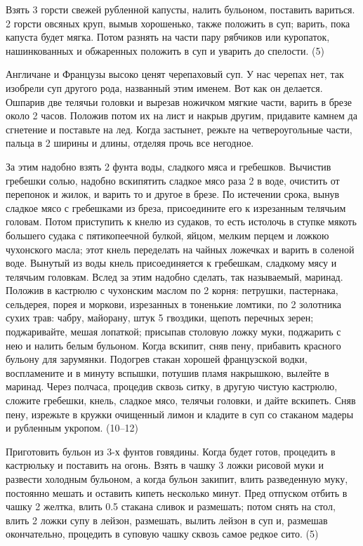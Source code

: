 
Взять 3 горсти свежей рубленной капусты, налить бульоном, поставить вариться. 2 горсти овсяных круп, вымыв хорошенько, также положить в суп; варить, пока капуста будет мягка. Потом разнять на части пару рябчиков или куропаток, нашинкованных и обжаренных положить в суп и уварить до спелости. (5)


Англичане и Французы высоко ценят черепаховый суп. У нас черепах нет, так изобрели суп другого рода, названный этим именем. Вот как он делается. Ошпарив две телячьи головки и вырезав ножичком мягкие части, варить в брезе около 2 часов. Положив потом их на лист и накрыв другим, придавите камнем да сгнетение и поставьте на лед. Когда застынет, режьте на четвероугольные части, пальца в 2 ширины и длины, отделяя прочь все негодное.

За этим надобно взять 2 фунта воды, сладкого мяса и гребешков. Вычистив гребешки солью, надобно вскипятить сладкое мясо раза 2 в воде, очистить от перепонок и жилок, и варить то и другое в брезе. По истечении срока, вынув сладкое мясо с гребешками из бреза, присоедините его к изрезанным телячьим головам. Потом приступить к кнелю из судаков, то есть истолочь в ступке мякоть большего судака с пятикопеечной булкой, яйцом, мелким перцем и ложкою чухонского масла; этот кнель переделать на чайных ложечках и варить в соленой воде. Вынутый из воды кнель присоединяется к гребешкам, сладкому мясу и телячьим головкам. Вслед за этим надобно сделать, так называемый, маринад. Положив в кастрюлю с чухонским маслом по 2 корня: петрушки, пастернака, сельдерея, порея и моркови, изрезанных в тоненькие ломтики, по 2 золотника сухих трав: чабру, майорану, штук 5 гвоздики, щепоть перечных зерен; поджаривайте, мешая лопаткой; присыпав столовую ложку муки, поджарить с нею и налить белым бульоном. Когда вскипит, сняв пену, прибавить красного бульону для зарумянки. Подогрев стакан хорошей французской водки, воспламените и в минуту вспышки, потушив пламя накрышкою, вылейте в маринад. Через полчаса, процедив сквозь ситку, в другую чистую кастрюлю, сложите гребешки, кнель, сладкое мясо, телячьи головки, и дайте вскипеть. Сняв пену, изрежьте в кружки очищенный лимон и кладите в суп со стаканом мадеры и рубленным укропом. (10–12)


Приготовить бульон из 3-х фунтов говядины. Когда будет готов, процедить в кастрюльку и поставить на огонь. Взять в чашку 3 ложки рисовой муки и развести холодным бульоном, а когда бульон закипит, влить разведенную муку, постоянно мешать и оставить кипеть несколько минут. Пред отпуском отбить в чашку 2 желтка, влить 0.5 стакана сливок и размешать; потом снять на стол, влить 2 ложки супу в лейзон, размешать, вылить лейзон в суп и, размешав окончательно, процедить в суповую чашку сквозь самое редкое сито. (5)

